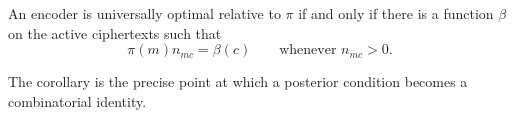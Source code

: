 \begin{corollary}\label{ch:cor:uo-factorization}
An encoder is universally optimal relative to $\pi$ if and only if there is a function $\beta$ on the active ciphertexts such that
\[
 \pi(m)n_{mc}=\beta(c)
 \qquad\text{whenever }n_{mc}>0.
\]
\end{corollary}
The corollary is the precise point at which a posterior condition becomes a combinatorial identity.
